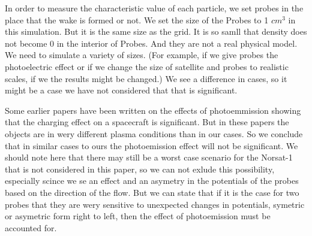 
In order to measure the characteristic value of each particle, we set probes in the
place that the wake is formed or not. 
We set the size of the Probes to 1 $cm^3$ in this simulation. But it is the same size as the grid.
It is so samll that density does not become 0 in the interior of Probes. And they are not a real 
physical model. We need to simulate a variety of sizes.
(For example, if we give probes the photoelectric effect or if we change the size of satellite and 
probes to realistic scales, if we the results might be changed.)
We see a difference in cases, so it might be a case we have not considered that that is significant.

Some earlier papers have been written on the effects of photoemmission showing that the charging effect 
on a spacecraft is significant.\citep{ergun_spacecraft_2010} But in these papers the objects are in wery different
plasma conditions than in our cases. So we conclude that in similar cases to ours the photoemission effect
will not be significant. We should note here that there may still be a worst case scenario for the Norsat-1
that is not considered in this paper, so we can not exlude this possibility, especially scince we se an effect and an
asymetry in the potentials of the probes based on the direction of the flow. But we can state that if 
it is the case for two probes that they are wery sensitive to unexpected changes in potentials, symetric or asymetric form 
right to left, then the effect of photoemission must be accounted for.